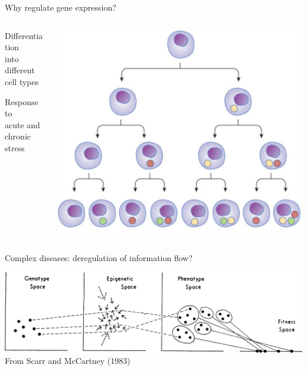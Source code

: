 \begin{frame}{Why regulate gene expression?}
    \begin{columns}
        \begin{column}{0.5\textwidth}
            \begin{center}
                \large%
                \alert{Differentiation} \\
                into different cell types

                \vspace{2\bigskipamount}

                Response to \\
                \alert{acute and chronic stress}
            \end{center}
        \end{column}
        \begin{column}{0.5\textwidth}
    \begin{center}
        \includegraphics[width=\textwidth]{figures/differentiation}
    \end{center}
        \end{column}
    \end{columns}

\end{frame}

\begin{frame}{Complex diseases: deregulation of information flow?}
    \begin{center}
        \includegraphics[width=\textwidth]{figures/epi_landscape} \\
        {\scriptsize%
         From Scarr and McCartney (1983)}
    \end{center}
\end{frame}

